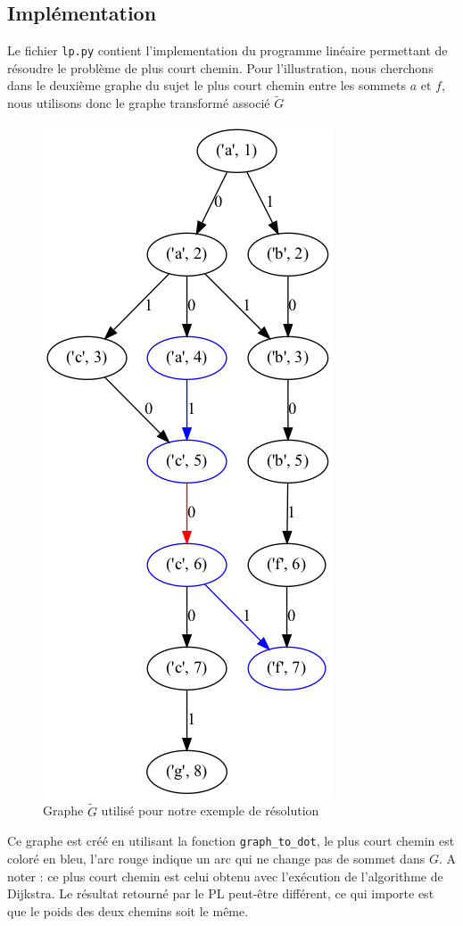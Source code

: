 \documentclass{article}
\begin{document}
\subsection{Implémentation}
Le fichier \texttt{lp.py} contient l'implementation du programme linéaire
permettant de résoudre le problème de plus court chemin. Pour l'illustration,
nous cherchons dans le deuxième graphe du sujet le plus court chemin entre les
sommets $a$ et $f$, nous utilisons donc le graphe transformé associé $\tilde{G}$
\begin{figure}[h]
    \centering
    \includegraphics[scale=0.4]{img/graph.png}
    \caption{Graphe $\tilde{G}$ utilisé pour notre exemple de résolution}
\end{figure}

Ce graphe est créé en utilisant la fonction \texttt{graph\_to\_dot}, le plus court
chemin est coloré en bleu, l'arc rouge indique un arc qui ne change pas de sommet dans $G$. A noter : ce plus court
chemin est celui obtenu avec l'exécution de l'algorithme de Dijkstra. Le résultat retourné par le PL peut-être
différent, ce qui importe est que le poids des deux chemins soit le même.
\end{document}

